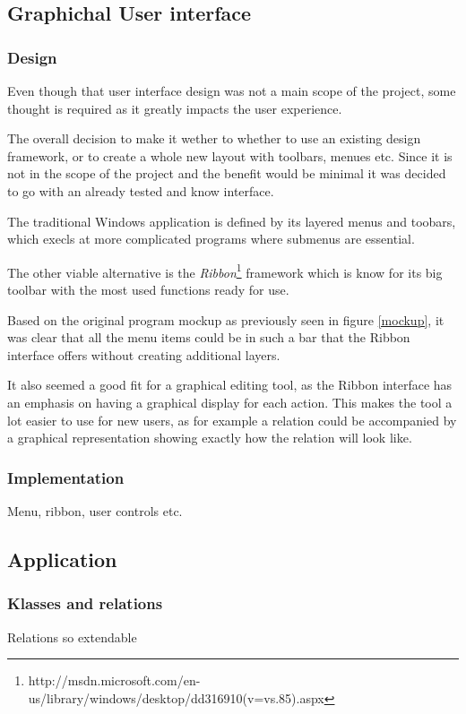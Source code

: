 \subsection{Graphichal User interface}
\subsubsection{Design}
Even though that user interface design was not a main scope of the project, some
thought is required as it greatly impacts the user experience. 

The overall decision to make it wether to whether to use an existing design
framework, or to create a whole new layout with toolbars, menues etc. Since it
is not in the scope of the project and the benefit would be minimal it was decided
to go with an already tested and know interface. 

The traditional Windows application is defined by its layered menus and
toobars,
which execls at more complicated programs where submenus are essential.

The other viable alternative is the \textit{Ribbon}\footnote{http://msdn.microsoft.com/en-us/library/windows/desktop/dd316910(v=vs.85).aspx} framework which is know for
its big toolbar with the most used functions ready for use.

Based on the original program mockup as previously seen in figure \ref{mockup},
it was clear that all the menu items could be in such a bar that the Ribbon
interface offers without creating additional layers.

It also seemed a good fit for a graphical editing tool, as the Ribbon interface
has an emphasis on having a graphical display for each action. This makes the
tool a lot easier to use for new users, as for example a relation could be
accompanied by a graphical representation showing exactly how the relation will
look like.
\subsubsection{Implementation}
Menu, ribbon, user controls etc.


\subsection{Application}
\subsubsection{Klasses and relations}
Relations so extendable

